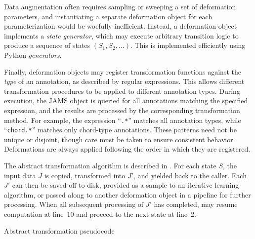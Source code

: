 \documentclass{article}
\begin{document}
Data augmentation often requires sampling or sweeping a set of deformation 
parameters, and instantiating a separate deformation object for each parameterization 
would be woefully inefficient.
Instead, a deformation object implements a \emph{state generator},
which may execute arbitrary transition logic to produce a sequence of 
states $(S_1, S_2, \dots)$.
This is implemented efficiently using Python \emph{generators}.

Finally, deformation objects may register transformation functions against the 
\emph{type} of an annotation, as described by regular expressions.
This allows different transformation procedures to be applied to different annotation types.
During execution, the JAMS object is queried for all annotations matching the specified
expression, and the results are processed by the corresponding transformation method.
For example, the expression ``\texttt{.*}'' matches all annotation types, while 
``\texttt{chord.*}'' matches only chord-type annotations.
These patterns need not be unique or disjoint, though care must be taken
to ensure consistent behavior.
Deformations are always applied following the order in which they are registered.

The abstract transformation algorithm is described in .
For each state $S$, the input data $J$ is copied, transformed into $J'$, and yielded back to the caller. 
Each $J'$ can then be saved off to disk, provided as a sample to an iterative learning 
algorithm, or passed along to another deformation object in a pipeline for further processing.
When all subsequent processing of $J'$ has completed,  may resume
computation at line~10 and proceed to the next state at line~2.

\begin{algorithm}[t]
\caption{Abstract transformation pseudocode\label{alg:transformation}}
\begin{algorithmic}[1]
            \EndFor{}
        \EndFor{}
    \EndFor{}
    \EndFunction{}
\end{algorithmic}
\end{algorithm}
\end{document}
